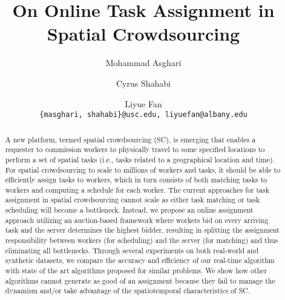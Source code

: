\documentclass{llncs}
\title{On Online Task Assignment in Spatial Crowdsourcing}
\begin{document}
\setlength{\textfloatsep}{2pt}
\setlength{\floatsep}{2pt}
\setlength{\intextsep}{2pt}


\author{
Mohammad Asghari \and Cyrus Shahabi \and Liyue Fan\\
\texttt{\{masghari, shahabi\}@usc.edu, liyuefan@albany.edu}
}


\maketitle
\vspace{-0.2in}
\begin{abstract}

A new platform, termed spatial crowdsourcing (SC), is emerging that enables a requester to commission workers to physically travel to some specified locations to perform a set of spatial tasks (i.e., tasks related to a geographical location and time). For spatial crowdsourcing to scale to millions of workers and tasks, it should be able to efficiently assign tasks to workers, which in turn consists of both matching tasks to workers and computing a schedule for each worker. The current approaches for task assignment in spatial crowdsourcing cannot scale as either task matching or task scheduling will become a bottleneck.  Instead, we propose an online assignment approach utilizing an auction-based framework where workers bid on every arriving task and the server determines the highest bidder, resulting in splitting the assignment responsibility between workers (for scheduling) and the server (for matching) and thus eliminating all bottlenecks. Through several experiments on both real-world and synthetic datasets, we compare the accuracy and efficiency of our real-time algorithm with state of the art algorithms proposed for similar problems. We show how other algorithms cannot generate as good of an assignment because they fail to manage the dynamism and/or take advantage of the spatiotemporal characteristics of SC.

\end{abstract}







%







\vspace{-0.15in}
\begin{scriptsize}


\end{scriptsize}

%
\end{document}
